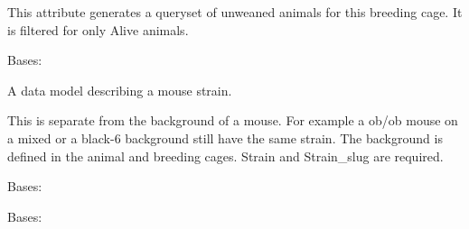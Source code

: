 \documentclass[letterpaper,10pt,english]{sphinxmanual}
\begin{document}
\begin{fulllineitems}
\begin{fulllineitems}
\end{fulllineitems}


\begin{fulllineitems}
\label{api:mousedb.animal.models.Breeding.unweaned}
This attribute generates a queryset of unweaned animals for this breeding cage.  It is filtered for only Alive animals.

\end{fulllineitems}


\end{fulllineitems}


\begin{fulllineitems}
\label{api:mousedb.animal.models.Strain}
Bases: 

A data model describing a mouse strain.

This is separate from the background of a mouse.  For example a ob/ob mouse on a mixed or a black-6 background still have the same strain.  The background is defined in the animal and breeding cages.  Strain and Strain\_slug are required.

\begin{fulllineitems}
\label{api:mousedb.animal.models.Strain.DoesNotExist}
Bases: 

\end{fulllineitems}


\begin{fulllineitems}
\label{api:mousedb.animal.models.Strain.MultipleObjectsReturned}
Bases: 

\end{fulllineitems}


\begin{fulllineitems}
\label{api:mousedb.animal.models.Strain.animal_set}
\end{fulllineitems}


\end{fulllineitems}
\end{document}
